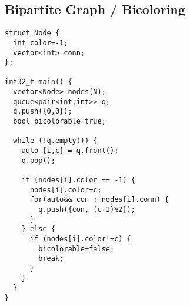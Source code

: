 \subsection{Bipartite Graph / Bicoloring}
\begin{lstlisting}
struct Node {
  int color=-1;
  vector<int> conn;
};

int32_t main() {
  vector<Node> nodes(N);
  queue<pair<int,int>> q;
  q.push({0,0});
  bool bicolorable=true;

  while (!q.empty()) {
    auto [i,c] = q.front();
    q.pop();

    if (nodes[i].color == -1) {
      nodes[i].color=c;
      for(auto&& con : nodes[i].conn) {
        q.push({con, (c+1)%2});
      }
    } else {
      if (nodes[i].color!=c) {
        bicolorable=false;
        break;
      }
    }
  }
}
\end{lstlisting}
